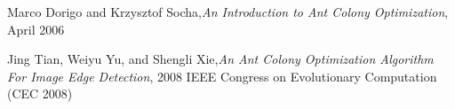 \documentclass[11pt]{article}
\begin{document}
\begin{thebibliography}{99}

 Marco Dorigo and Krzysztof Socha,{\textit{An Introduction to
Ant Colony Optimization}}, April 2006

 Jing Tian, Weiyu Yu, and Shengli Xie,{\textit{An Ant Colony Optimization Algorithm For Image Edge Detection}}, 2008 IEEE Congress on Evolutionary Computation (CEC 2008) 

\end{thebibliography}
\end{document}
